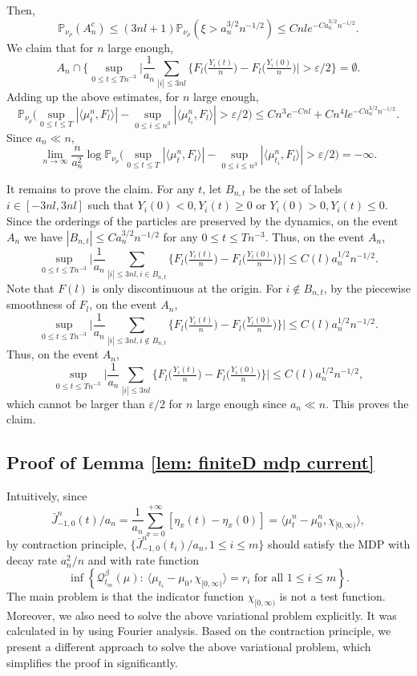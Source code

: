 \documentclass[reqno,11pt]{amsart}
\numberwithin{equation}{section}
\newcommand{\Pbb}{\mathbb{P}}
\begin{document}
Then,
\[\Pbb_{\nu_\rho}  (A_n^c) \leq (3nl+1) \Pbb_{\nu_\rho} (\xi > a_n^{3/2}n^{-1/2}) \leq C n l e^{-Ca_n^{3/2}n^{-1/2}}.\]
We claim that for $n$ large enough, 
\[A_n \cap \Big\{   \sup_{0 \leq t \leq Tn^{-3}} \big|\frac{1}{a_n} \sum_{|i| \leq 3 n l} \Big\{F_l \big(\tfrac{Y_i(t)}{n}\big) - F_l \big(\tfrac{Y_i(0)}{n}\big)  \big|  >  \varepsilon/2 \Big\} = \emptyset.\]
Adding up the above estimates,  for $n$ large enough,
\[	\Pbb_{\nu_\rho} \Big( \sup_{0 \leq t \leq T} |\langle \mu^n_t,F_l\rangle | - \sup_{0 \leq i \leq n^3} |\langle \mu^n_{t_i},F_l\rangle |  >  \varepsilon/2 \Big) \leq C n^3 e^{-C n l} + C n^4 l e^{-Ca_n^{3/2}n^{-1/2}}.\]
Since $a_n \ll n$,
\[\lim_{n \rightarrow \infty} \frac{n}{a_n^2} \log \Pbb_{\nu_\rho} \Big( \sup_{0 \leq t \leq T} |\langle \mu^n_t,F_l\rangle | - \sup_{0 \leq i \leq n^3} |\langle \mu^n_{t_i},F_l\rangle |  >  \varepsilon/2 \Big) = - \infty.\]

It remains to prove the claim. For any $t$, let $B_{n,t}$ be the set of labels $i \in [-3nl,3nl]$ such that $Y_i (0) < 0, Y_i (t) \geq 0$ or  $Y_i (0) > 0, Y_i (t) \leq 0$.  Since the orderings of the particles are preserved by the dynamics, on the event $A_n$ we have $|B_{n,t}| \leq C a_n^{3/2} n^{-1/2}$ for any $0 \leq t \leq T n^{-3}$. Thus, on the event $A_n$,
\[\sup_{0 \leq t \leq Tn^{-3}} \big|\frac{1}{a_n} \sum_{|i| \leq 3 n l, i \in B_{n,t}} \Big\{F_l \big(\tfrac{Y_i(t)}{n}\big) - F_l \big(\tfrac{Y_i(0)}{n}\big)  \Big\} \big| \leq C(l) a_n^{1/2} n^{-1/2}.\]
Note that $F(l)$ is only discontinuous at the origin. For $i \notin B_{n,t}$, by the piecewise smoothness of $F_l$, on the event $A_n$,
\[\sup_{0 \leq t \leq Tn^{-3}} \big|\frac{1}{a_n} \sum_{|i| \leq 3 n l, i \notin B_{n,t}} \Big\{F_l \big(\tfrac{Y_i(t)}{n}\big) - F_l \big(\tfrac{Y_i(0)}{n}\big)  \Big\} \big| \leq C(l) a_n^{1/2} n^{-1/2}. \]
Thus, on the event $A_n$, 
\[\sup_{0 \leq t \leq Tn^{-3}} \big|\frac{1}{a_n} \sum_{|i| \leq 3 n l} \Big\{F_l \big(\tfrac{Y_i(t)}{n}\big) - F_l \big(\tfrac{Y_i(0)}{n}\big)  \Big\} \big| \leq C(l) a_n^{1/2} n^{-1/2},\]
which cannot be larger than $\varepsilon / 2$ for $n$ large enough since $a_n \ll n$. This proves the claim. 

\subsection{Proof of Lemma \ref{lem: finiteD mdp current}}\label{subsec:pf lemma 4.2} Intuitively, since 
\[\bar{J}^n_{-1,0} (t) / a_n = \frac{1}{a_n} \sum_{x=0}^{+\infty} [\eta_x (t) - \eta_x (0)] = \langle \mu^n_t - \mu^n_0, \chi_{[0,\infty)}\rangle,\]
by contraction principle, $\{\bar{J}^n_{-1,0} (t_i)/a_n, 1 \leq i \leq m\}$ should satisfy the MDP with decay rate $a_n^2/n$ and with rate function
\[\inf\left\{\mathcal{Q}_{t_m}^\beta(\mu):~ \langle \mu_{t_i} -\mu_{0},  \chi_{[0,\infty) } \rangle=r_i\text{~for all~}1\leq i\leq m\right\}.\]
The main problem is that the indicator function $\chi_{[0,\infty)}$ is not a test function.  Moreover, we also need to solve the above variational problem explicitly. It was calculated in \cite{xue2024sample} by using Fourier analysis.  Based on the contraction principle, we present a different approach to solve the above variational problem, which simplifies the proof in \cite{xue2024sample} significantly. 
\end{document}
